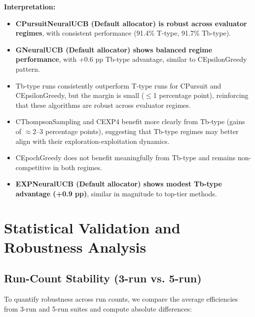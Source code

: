 \documentclass[12pt,a4paper]{article}
\newcommand{\legacy}[1]{\textcolor{legacycolor}{\textbf{#1}}}
\newcommand{\neural}[1]{\textcolor{neuralcolor}{\textbf{#1}}}
\begin{document}
\textbf{Interpretation:}
\begin{itemize}
\item \neural{CPursuitNeuralUCB (Default allocator) is robust across evaluator regimes}, with consistent performance (91.4\% T-type, 91.7\% Tb-type).
\item \neural{GNeuralUCB (Default allocator) shows balanced regime performance}, with +0.6 pp Tb-type advantage, similar to CEpsilonGreedy pattern.
\item Tb-type runs consistently outperform T-type runs for CPursuit and CEpsilonGreedy, but the margin is small ($\leq$1 percentage point), reinforcing that these algorithms are robust across evaluator regimes.
\item CThompsonSampling and CEXP4 benefit more clearly from Tb-type (gains of $\approx$2–3 percentage points), suggesting that Tb-type regimes may better align with their exploration-exploitation dynamics.
\item CEpochGreedy does not benefit meaningfully from Tb-type and remains non-competitive in both regimes.
\item \legacy{EXPNeuralUCB (Default allocator) shows modest Tb-type advantage (+0.9 pp)}, similar in magnitude to top-tier methods.
\end{itemize}

\newpage
\section{Statistical Validation and Robustness Analysis}

\subsection{Run-Count Stability (3-run vs. 5-run)}

To quantify robustness across run counts, we compare the average efficiencies from 3-run and 5-run suites and compute absolute differences:
\end{document}
